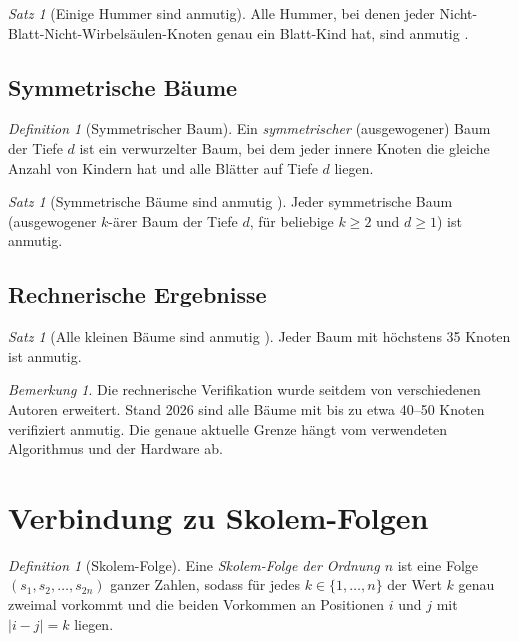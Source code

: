 \documentclass[12pt,a4paper]{amsart}
\theoremstyle{definition}
\theoremstyle{remark}
\newtheorem{satz}[theorem]{Satz}
\newtheorem{bemerkung}[theorem]{Bemerkung}
\newtheorem{definition_de}[theorem]{Definition}
\begin{document}
\begin{satz}[Einige Hummer sind anmutig]\label{satz:hummer}
Alle Hummer, bei denen jeder Nicht-Blatt-Nicht-Wirbelsäulen-Knoten genau ein
Blatt-Kind hat, sind anmutig \cite{Huang1994}.
\end{satz}

\subsection{Symmetrische Bäume}

\begin{definition_de}[Symmetrischer Baum]
Ein \emph{symmetrischer} (ausgewogener) Baum der Tiefe $d$ ist ein verwurzelter Baum,
bei dem jeder innere Knoten die gleiche Anzahl von Kindern hat und alle Blätter auf
Tiefe $d$ liegen.
\end{definition_de}

\begin{satz}[Symmetrische Bäume sind anmutig \cite{Cahit1980}]\label{satz:sym_baeume}
Jeder symmetrische Baum (ausgewogener $k$-ärer Baum der Tiefe $d$, für beliebige
$k \geq 2$ und $d \geq 1$) ist anmutig.
\end{satz}

\subsection{Rechnerische Ergebnisse}

\begin{satz}[Alle kleinen Bäume sind anmutig \cite{HeadWilson2003}]\label{satz:klein}
Jeder Baum mit höchstens 35 Knoten ist anmutig.
\end{satz}

\begin{bemerkung}
Die rechnerische Verifikation wurde seitdem von verschiedenen Autoren erweitert.
Stand 2026 sind alle Bäume mit bis zu etwa 40--50 Knoten verifiziert anmutig. Die
genaue aktuelle Grenze hängt vom verwendeten Algorithmus und der Hardware ab.
\end{bemerkung}

\section{Verbindung zu Skolem-Folgen}\label{sec:skolem}

\begin{definition_de}[Skolem-Folge]
Eine \emph{Skolem-Folge der Ordnung $n$} ist eine Folge $(s_1, s_2, \ldots, s_{2n})$
ganzer Zahlen, sodass für jedes $k \in \{1, \ldots, n\}$ der Wert $k$ genau zweimal
vorkommt und die beiden Vorkommen an Positionen $i$ und $j$ mit $|i-j| = k$ liegen.
\end{definition_de}
\end{document}
